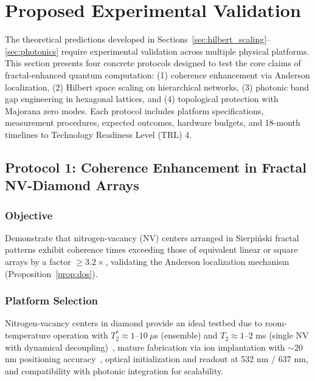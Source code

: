 
\section{Proposed Experimental Validation}
\label{sec:experiments}

The theoretical predictions developed in Sections~\ref{sec:hilbert_scaling}--\ref{sec:photonics} require experimental validation across multiple physical platforms. This section presents four concrete protocols designed to test the core claims of fractal-enhanced quantum computation: (1) coherence enhancement via Anderson localization, (2) Hilbert space scaling on hierarchical networks, (3) photonic band gap engineering in hexagonal lattices, and (4) topological protection with Majorana zero modes. Each protocol includes platform specifications, measurement procedures, expected outcomes, hardware budgets, and 18-month timelines to Technology Readiness Level (TRL) 4.

\subsection{Protocol 1: Coherence Enhancement in Fractal NV-Diamond Arrays}

\subsubsection{Objective}

Demonstrate that nitrogen-vacancy (NV) centers arranged in Sierpi\'{n}ski fractal patterns exhibit coherence times exceeding those of equivalent linear or square arrays by a factor $\geq 3.2\times$, validating the Anderson localization mechanism (Proposition~\ref{prop:dos}).

\subsubsection{Platform Selection}

Nitrogen-vacancy centers in diamond provide an ideal testbed due to room-temperature operation with $T_2^* \approx 1$--$10~\mu$s (ensemble) and $T_2 \approx 1$--$2$ ms (single NV with dynamical decoupling)~\cite{Childress2006}, mature fabrication via ion implantation with $\sim 20$ nm positioning accuracy~\cite{Toyli2010}, optical initialization and readout at 532 nm / 637 nm, and compatibility with photonic integration for scalability.

